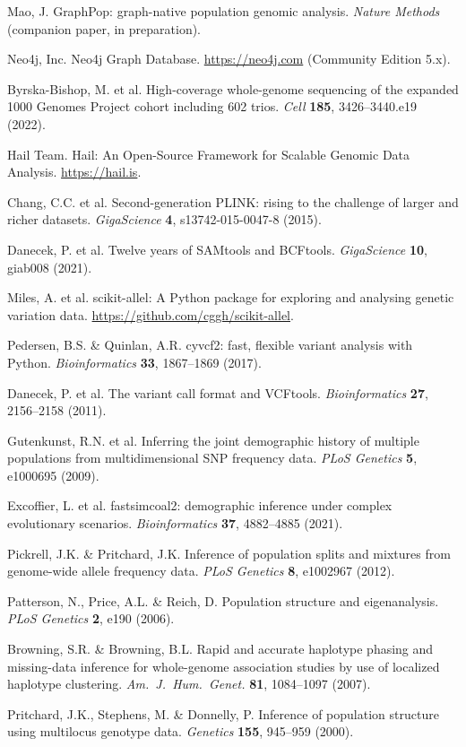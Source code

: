 \documentclass[11pt,a4paper]{article}
\begin{document}
\begin{enumerate}[leftmargin=*, label={[\arabic*]}, itemsep=1pt, parsep=0pt]
\item Mao, J. GraphPop: graph-native population genomic analysis. \textit{Nature Methods} (companion paper, in preparation).
\item Neo4j, Inc. Neo4j Graph Database. \url{https://neo4j.com} (Community Edition 5.x).
\item Byrska-Bishop, M. et al. High-coverage whole-genome sequencing of the expanded 1000 Genomes Project cohort including 602 trios. \textit{Cell} \textbf{185}, 3426--3440.e19 (2022).
\item Hail Team. Hail: An Open-Source Framework for Scalable Genomic Data Analysis. \url{https://hail.is}.
\item Chang, C.C. et al. Second-generation PLINK: rising to the challenge of larger and richer datasets. \textit{GigaScience} \textbf{4}, s13742-015-0047-8 (2015).
\item Danecek, P. et al. Twelve years of SAMtools and BCFtools. \textit{GigaScience} \textbf{10}, giab008 (2021).
\item Miles, A. et al. scikit-allel: A Python package for exploring and analysing genetic variation data. \url{https://github.com/cggh/scikit-allel}.
\item Pedersen, B.S. \& Quinlan, A.R. cyvcf2: fast, flexible variant analysis with Python. \textit{Bioinformatics} \textbf{33}, 1867--1869 (2017).
\item Danecek, P. et al. The variant call format and VCFtools. \textit{Bioinformatics} \textbf{27}, 2156--2158 (2011).
\item Gutenkunst, R.N. et al. Inferring the joint demographic history of multiple populations from multidimensional SNP frequency data. \textit{PLoS Genetics} \textbf{5}, e1000695 (2009).
\item Excoffier, L. et al. fastsimcoal2: demographic inference under complex evolutionary scenarios. \textit{Bioinformatics} \textbf{37}, 4882--4885 (2021).
\item Pickrell, J.K. \& Pritchard, J.K. Inference of population splits and mixtures from genome-wide allele frequency data. \textit{PLoS Genetics} \textbf{8}, e1002967 (2012).
\item Patterson, N., Price, A.L. \& Reich, D. Population structure and eigenanalysis. \textit{PLoS Genetics} \textbf{2}, e190 (2006).
\item Browning, S.R. \& Browning, B.L. Rapid and accurate haplotype phasing and missing-data inference for whole-genome association studies by use of localized haplotype clustering. \textit{Am.\ J.\ Hum.\ Genet.} \textbf{81}, 1084--1097 (2007).
\item Pritchard, J.K., Stephens, M. \& Donnelly, P. Inference of population structure using multilocus genotype data. \textit{Genetics} \textbf{155}, 945--959 (2000).
\end{enumerate}
\end{document}
